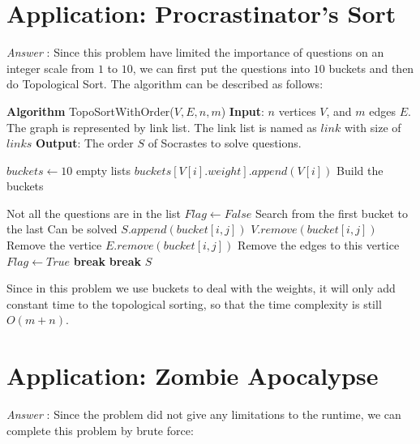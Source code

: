 \documentclass[11pt]{article}
\begin{document}
\section{Application: Procrastinator's Sort}
\noindent\emph{Answer} : Since this problem have limited the importance of questions on an integer scale from $1$ to $10$, we can first put the questions into $10$ buckets and then do Topological Sort. The algorithm can be described as follows:
\begin{algorithmic}
	\State \textbf{Algorithm} TopoSortWithOrder($V,E,n,m$)
	\State \textbf{Input}: $n$ vertices $V$, and $m$ edges $E$. The graph is represented by link list. The link list is named as $link$ with size of $links$
	\State \textbf{Output}: The order $S$ of Socrastes to solve questions.
	
	\State $buckets\gets10$ empty lists
		\State $buckets[V[i].weight].append(V[i])$ \Comment Build the buckets
	\EndFor
	
	 \Comment Not all the questions are in the list
		\State $Flag \gets False$
		\Comment Search from the first bucket to the last
				\Comment Can be solved
					\State $S.append(bucket[i,j])$
					\State $V.remove(bucket[i,j])$ \Comment Remove the vertice
					\State $E.remove(bucket[i,j])$ \Comment Remove the edges to this vertice
					\State $Flag\gets True$
					\State \textbf{break}
				\EndIf
			\EndFor
				\State \textbf{break}
			\EndIf
		\EndFor
	\EndWhile
	\State \Return $S$
\end{algorithmic}

Since in this problem we use buckets to deal with the weights, it will only add constant time to the topological sorting, so that the time complexity is still $O(m+n)$.
\section{Application: Zombie Apocalypse}
\noindent\emph{Answer} : Since the problem did not give any limitations to the runtime, we can complete this problem by brute force:
\end{document}
